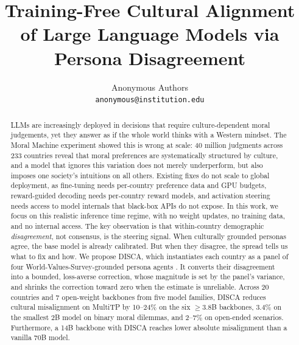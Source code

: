 \documentclass{article}
\title{%
  Training-Free Cultural Alignment of 
  Large Language Models via Persona Disagreement%
}
\author{%
  Anonymous Authors\\
  \texttt{anonymous@institution.edu}
}
\begin{document}
\maketitle

\begin{abstract}

LLMs are increasingly deployed in decisions that require culture-dependent moral judgements, yet they answer as if the whole world thinks with a Western mindset. The Moral Machine experiment \citep{awad2018moral} showed this is wrong at scale: 40 million judgments across 233 countries reveal that moral preferences are systematically structured by culture, and a model that ignores this variation does not merely underperform, but also imposes one society's intuitions on all others. Existing fixes do not scale to global deployment, as fine-tuning needs per-country preference data and GPU budgets, reward-guided decoding needs per-country reward models, and activation steering needs access to model internals that black-box APIs do not expose. In this work, we focus on this realistic inference time regime, with no weight updates, no training data, and no internal access. The key observation is that within-country demographic \emph{disagreement}, not consensus, is the steering signal. When culturally grounded personas agree, the base model is already calibrated. But when they disagree, the spread tells us what to fix and how. We propose DISCA,  which instantiates each country as a panel of four World-Values-Survey-grounded persona agents \citep{haerpfer2022wvs}. It converts their disagreement into a bounded, loss-averse correction, whose magnitude is set by the panel's variance, and shrinks the correction toward zero when the estimate is unreliable. Across 20 countries and 7 open-weight backbones  from five model families, DISCA reduces cultural misalignment on MultiTP \citep{jin2025multitp} by 10--24\% on the six $\geq$3.8B backbones, 3.4\% on the smallest 2B model on binary moral dilemmas, and 2--7\% on open-ended scenarios. Furthermore, a 14B backbone with DISCA reaches lower absolute misalignment than a vanilla 70B model.


\end{abstract}
\end{document}
